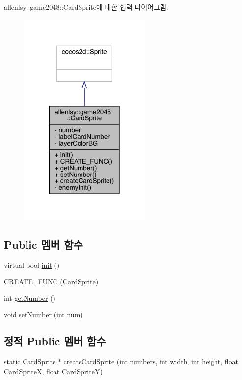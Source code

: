 allenlsy\+:\+:game2048\+:\+:Card\+Sprite에 대한 협력 다이어그램\+:
\nopagebreak
\begin{figure}[H]
\begin{center}
\leavevmode
\includegraphics[width=186pt]{d0/dbf/classallenlsy_1_1game2048_1_1_card_sprite__coll__graph}
\end{center}
\end{figure}
\subsection*{Public 멤버 함수}
\begin{DoxyCompactItemize}
\item 
virtual bool \hyperlink{classallenlsy_1_1game2048_1_1_card_sprite_ad6769d950c3b9b87092bd7e40d61dd4d}{init} ()
\item 
\hyperlink{classallenlsy_1_1game2048_1_1_card_sprite_acb47a7c82b77019fab80d7d167495c57}{C\+R\+E\+A\+T\+E\+\_\+\+F\+U\+NC} (\hyperlink{classallenlsy_1_1game2048_1_1_card_sprite}{Card\+Sprite})
\item 
int \hyperlink{classallenlsy_1_1game2048_1_1_card_sprite_ac483e81f56c1c7d08a83175061c8edb5}{get\+Number} ()
\item 
void \hyperlink{classallenlsy_1_1game2048_1_1_card_sprite_a7f560bb8253477188273aac709aae087}{set\+Number} (int num)
\end{DoxyCompactItemize}
\subsection*{정적 Public 멤버 함수}
\begin{DoxyCompactItemize}
\item 
static \hyperlink{classallenlsy_1_1game2048_1_1_card_sprite}{Card\+Sprite} $\ast$ \hyperlink{classallenlsy_1_1game2048_1_1_card_sprite_a3a14745470040dfb933397ccb83344d7}{create\+Card\+Sprite} (int numbers, int width, int height, float Card\+SpriteX, float Card\+SpriteY)
\end{DoxyCompactItemize}
